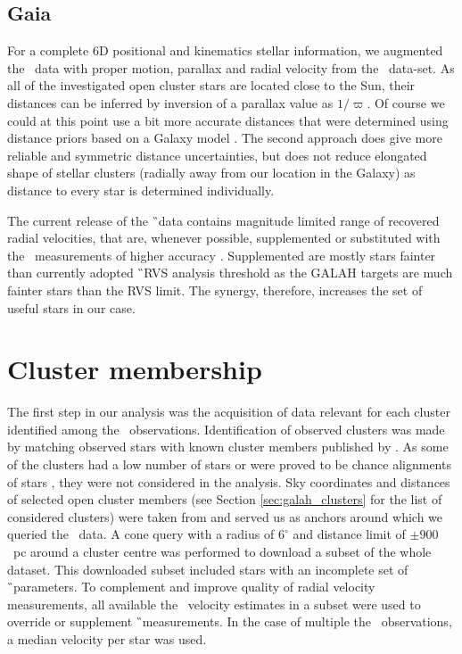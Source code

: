 \subsection{Gaia}
\label{sec:gaia_clusters}
For a complete 6D positional and kinematics stellar information, we augmented the \Gh\ data with proper motion, parallax and radial velocity from the \Gs\ data-set. As all of the investigated open cluster stars are located close to the Sun, their distances can be inferred by inversion of a parallax value as $1 / \varpi$. Of course we could at this point use a bit more accurate distances that were determined using distance priors based on a Galaxy model \cite{2018AJ....156...58B}. The second approach does give more reliable and symmetric distance uncertainties, but does not reduce elongated shape of stellar clusters (radially away from our location in the Galaxy) as distance to every star is determined individually.

The current release of the \G\ data contains magnitude limited range of recovered radial velocities, that are, whenever possible, supplemented or substituted with the \Gh\ measurements of higher accuracy \cite{2018arXiv180406344Z}. Supplemented are mostly stars fainter than currently adopted \G\ RVS \cite{2018A&A...616A...5C} analysis threshold as the GALAH targets are much fainter stars than the RVS limit. The synergy, therefore, increases the set of useful stars in our case.

\section{Cluster membership}
\label{sec:membership_v2}
The first step in our analysis was the acquisition of data relevant for each cluster identified among the \Gh\ observations. Identification of observed clusters was made by matching observed stars with known cluster members published by \citet{2018A&A...618A..93C}. As some of the clusters had a low number of stars or were proved to be chance alignments of stars \citep{2018MNRAS.480.5242K}, they were not considered in the analysis. Sky coordinates and distances of selected open cluster members (see Section \ref{sec:galah_clusters} for the list of considered clusters) were taken from \citet{2018A&A...618A..93C} and served us as anchors around which we queried the \Gs\ data. A cone query with a radius of $6^\circ$ and distance limit of $\pm900$~pc around a cluster centre was performed to download a subset of the whole dataset. This downloaded subset included stars with an incomplete set of \G\ parameters. To complement and improve quality of radial velocity measurements, all available the \Gh\ velocity estimates in a subset were used to override or supplement \G\ measurements. In the case of multiple the \Gh\ observations, a median velocity per star was used.

